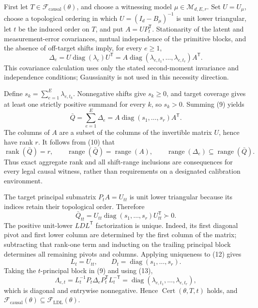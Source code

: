 First let \(T\in\mathcal F_{\mathrm{causal}}(\theta)\), and choose a witnessing model \(\mu\in\mathcal M_{d,E,r}\).  Set \(U=U_{\mu}\), choose a topological ordering in which \(U=(I_d-B_{\mu})^{-1}\) is unit lower triangular, let \(t\) be the induced order on \(T\), and put \(A=UP_t^{\mathsf T}\).  Stationarity of the latent and measurement-error covariances, mutual independence of the primitive blocks, and the absence of off-target shifts imply, for every \(e\ge1\),
\[
 \Delta_e
 =U\operatorname{diag}(\lambda_e)U^{\mathsf T}
 =A\operatorname{diag}(\lambda_{e,t_1},\ldots,\lambda_{e,t_r})A^{\mathsf T}. \tag{9}
\]
This covariance calculation uses only the stated second-moment invariance and independence conditions; Gaussianity is not used in this necessity direction.

Define \(s_k=\sum_{e=1}^E\lambda_{e,t_k}\).  Nonnegative shifts give \(s_k\ge0\), and target coverage gives at least one strictly positive summand for every \(k\), so \(s_k>0\).  Summing (9) yields
\[
 \bar Q=\sum_{e=1}^E\Delta_e
 =A\operatorname{diag}(s_1,\ldots,s_r)A^{\mathsf T}. \tag{10}
\]
The columns of \(A\) are a subset of the columns of the invertible matrix \(U\), hence have rank \(r\).  It follows from (10) that
\[
 \operatorname{rank}(\bar Q)=r,\qquad
 \operatorname{range}(\bar Q)=\operatorname{range}(A),\qquad
 \operatorname{range}(\Delta_e)\subseteq\operatorname{range}(\bar Q). \tag{11}
\]
Thus exact aggregate rank and all shift-range inclusions are consequences for every legal causal witness, rather than requirements on a designated calibration environment.

The target principal submatrix \(P_tA=U_{tt}\) is unit lower triangular because its indices retain their topological order.  Therefore
\[
 \bar Q_{tt}=U_{tt}\operatorname{diag}(s_1,\ldots,s_r)U_{tt}^{\mathsf T}\succ0. \tag{12}
\]
The positive unit-lower \(LDL^{\mathsf T}\) factorization is unique.  Indeed, its first diagonal pivot and first lower column are determined by the first column of the matrix; subtracting that rank-one term and inducting on the trailing principal block determines all remaining pivots and columns.  Applying uniqueness to (12) gives
\[
 L_t=U_{tt},\qquad D_t=\operatorname{diag}(s_1,\ldots,s_r). \tag{13}
\]
Taking the \(t\)-principal block in (9) and using (13),
\[
 \Lambda_{e,t}
 =L_t^{-1}P_t\Delta_eP_t^{\mathsf T}L_t^{-\mathsf T}
 =\operatorname{diag}(\lambda_{e,t_1},\ldots,\lambda_{e,t_r}), \tag{14}
\]
which is diagonal and entrywise nonnegative.  Hence \(\operatorname{Cert}(\theta,T,t)\) holds, and
\(\mathcal F_{\mathrm{causal}}(\theta)\subseteq\mathcal F_{\mathrm{LDL}}(\theta)\).

